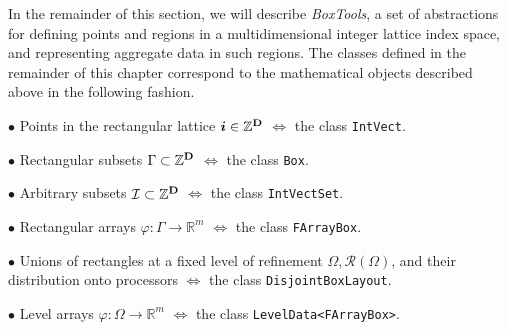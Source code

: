 In the remainder of this section, we will describe {\it BoxTools},
a set of abstractions for defining points and regions in a
multidimensional integer lattice index space, and representing
aggregate data in such regions. 
The classes defined in the remainder of this chapter correspond to the
mathematical objects described above in the following fashion.
\begin{trivlist}
\item $\bullet$
Points in the rectangular lattice ${\boldsymbol{i}} \in \mathbb{Z}^{\mathbf{D}}$ 
$\Leftrightarrow$ the class {\tt IntVect}.
\item $\bullet$
Rectangular subsets $\Gamma \subset \mathbb{Z}^{\mathbf{D}}$ $\Leftrightarrow$
the class {\tt Box}.
\item $\bullet$
Arbitrary subsets $\mathcal{I} \subset \mathbb{Z}^{\mathbf{D}}$ $\Leftrightarrow$
the class {\tt IntVectSet}.
\item $\bullet$
Rectangular arrays $\varphi : \Gamma \rightarrow \mathbb{R}^m$
$\Leftrightarrow$ the class {\tt FArrayBox}.
\item $\bullet$
Unions of rectangles at a fixed level of refinement
$\Omega, \mathcal{R}(\Omega)$, and their distribution onto processors
$\Leftrightarrow$ the class
{\tt DisjointBoxLayout}.
\item $\bullet$
Level arrays $\varphi : \Omega \rightarrow \mathbb{R}^m$ $\Leftrightarrow$
the class {\tt LevelData<FArrayBox>}.
\end{trivlist}
